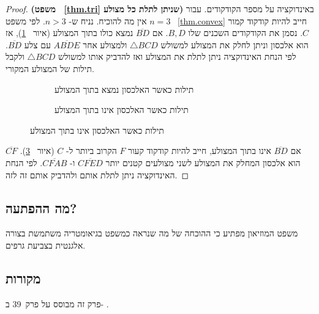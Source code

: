 \begin{proof} \textbf{%
(משפט%
~\ref{thm.tri}
שניתן לתלת כל מצולע)}
באינדוקציה על מספר הקודקודים. עבור
$n=3$
אין מה להוכיח. נניח ש-%
$n>3$.
לפי משפט%
~\ref{thm.convex}
חייב להיות קודקוד קמור
$C$.
נסמן את הקודקודים השכנים שלו
$B,D$.
אם
$\overline{BD}$
נמצא כולו בתוך המצולע 
(איור~%
\ref{f.contained}),
אז הוא אלכסון וניתן לחלק את המצולע למשולש 
$\triangle BCD$
ולמצולע אחר
$\overline{ABDE}$
עם צלע
$\overline{BD}$.
לפי הנחת האינדוקציה ניתן לתלת את המצולע ואז להדביק אותו למשולש
$\triangle BCD$
ולקבל תילות של המצולע המקורי.
\begin{figure}[tb]
\begin{center}
\begin{subfigure}{.4\textwidth}\centering
{}
\caption{תילות כאשר האלכסון נמצא בתוך המצולע}\label{f.contained}
\end{subfigure}
\hspace{3em}
\begin{subfigure}{.4\textwidth}\centering
{}
\caption{תילות כאשר האלכסון אינו בתוך המצולע}\label{f.museum.concave-vertices}
\end{subfigure}
\end{center}
\end{figure}

אם 
$\overline{BD}$
אינו בתוך המצולע, חייב להיות קודקוד קעור
$F$
הקרוב ביותר ל-%
$C$
(איור~%
\ref{f.museum.concave-vertices}).
$\overline{CF}$
הוא אלכסון המחלק את המצולע לשני מצולעים קטנים יותר
$\overline{CFED}$
ו-%
$\overline{CFAB}$.
לפי הנחת האינדוקציה ניתן לתלת אותם ולהדביק אותם זה לזה.
\end{proof}


\subsection*{מה ההפתעה?}
משפט המוזיאון מפתיע כי ההוכחה של מה שנראה כמשפט בגיאומטריה משתמשת בצורה אלגנטית בצביעת גרפים.

\subsection*{מקורות}

פרק זה מבוסס על פרק~39 ב-%
\cite{thebook}.
